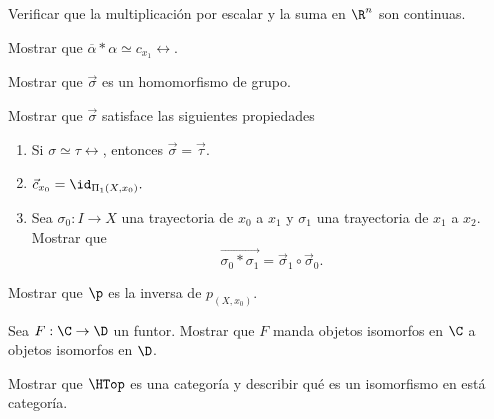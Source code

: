 \begin{ejercicio}
        Verificar que la multiplicación por escalar y la suma en $\R^n$ son continuas.
    \end{ejercicio}

\begin{ejercicio}
        Mostrar que $\overline{\alpha}*\alpha\simeq c_{x_1}\rel$.
    \end{ejercicio}

\begin{ejercicio}
        Mostrar que $\Vec{\sigma}$ es un homomorfismo de grupo.
    \end{ejercicio}

\begin{ejercicio}
        Mostrar que $\Vec{\sigma}$ satisface las siguientes propiedades
        \begin{enumerate}
            \item[(1)] Si $\sigma\simeq\tau\rel$, entonces $\Vec{\sigma}=\Vec{\tau}.$
            \item[(2)] $\Vec{c}_{x_0}=\id_{\Pi_1(X,x_0)}.$ 
            \item[(3)]  Sea $\sigma_0:I\to X$ una trayectoria de $x_0$ a $x_1$ y $\sigma_1$ una trayectoria de $x_1$ a $x_2$. Mostrar que $$\overrightarrow{\sigma_0*\sigma_1}=\Vec{\sigma}_1\circ \Vec{\sigma}_0.$$
        \end{enumerate}
    \end{ejercicio}

\begin{ejercicio}
    Mostrar que $\p$ es la inversa de $p_{(X,x_0)
    }$.
\end{ejercicio}

\begin{ejercicio}
    Sea $F:\C\to\D$ un funtor. Mostrar que $F$ manda objetos isomorfos en $\C$ a objetos isomorfos en $\D$.
\end{ejercicio}

\begin{ejercicio}
        Mostrar que $\HTop$ es una categoría y describir qué es un isomorfismo en está categoría.
    \end{ejercicio}

